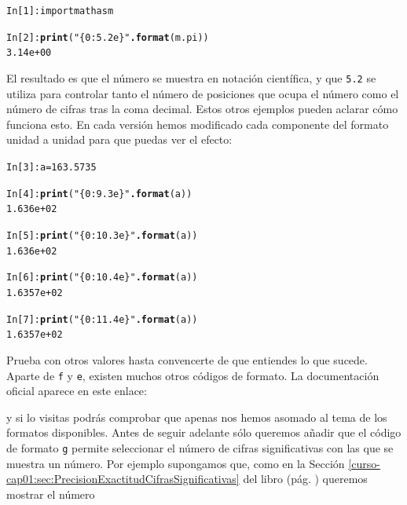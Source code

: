 \documentclass[10pt,a4paper]{article}\usepackage[]{graphicx}\usepackage[]{color}
\makeatletter
\newcommand{\hlstr}[1]{\textcolor[rgb]{0.192,0.494,0.8}{#1}}%
\newcommand{\hlkwd}[1]{\textcolor[rgb]{0.737,0.353,0.396}{\textbf{#1}}}%
\newenvironment{kframe}{%
 \def\at@end@of@kframe{}%
 \ifinner\ifhmode%
  \def\at@end@of@kframe{\end{minipage}}%
  \begin{minipage}{\columnwidth}%
 \fi\fi%
 \def\FrameCommand##1{\hskip\@totalleftmargin \hskip-\fboxsep
 \colorbox{shadecolor}{##1}\hskip-\fboxsep
     \hskip-\linewidth \hskip-\@totalleftmargin \hskip\columnwidth}%
 \MakeFramed {\advance\hsize-\width
   \@totalleftmargin\z@ \linewidth\hsize
   \@setminipage}}%
 {\par\unskip\endMakeFramed%
 \at@end@of@kframe}
\newenvironment{knitrout}{}{} %
\newcounter {cont01}
\makeatother
\begin{document}
\begin{knitrout}
\color{fgcolor}\begin{kframe}
\begin{alltt}
In [1]: import math as m

In [2]: \hlkwd{print}(\hlstr{"\{0:5.2e\}"}\hlkwd{.format}(m.pi))
3.14e+00
\end{alltt}
\end{kframe}
\end{knitrout}
El resultado es que el número se muestra en notación científica, y que {\tt 5.2} se utiliza para controlar tanto el número de posiciones que ocupa el número como el número de cifras tras la coma decimal. Estos otros ejemplos pueden aclarar cómo funciona esto. En cada versión hemos modificado cada componente del formato unidad a unidad para que puedas ver el efecto:
\begin{knitrout}
\color{fgcolor}\begin{kframe}
\begin{alltt}
In [3]: a = 163.5735

In [4]: \hlkwd{print}(\hlstr{"\{0:9.3e\}"}\hlkwd{.format}(a))
1.636e+02

In [5]: \hlkwd{print}(\hlstr{"\{0:10.3e\}"}\hlkwd{.format}(a))
 1.636e+02

In [6]: \hlkwd{print}(\hlstr{"\{0:10.4e\}"}\hlkwd{.format}(a))
1.6357e+02

In [7]: \hlkwd{print}(\hlstr{"\{0:11.4e\}"}\hlkwd{.format}(a))
 1.6357e+02
\end{alltt}
\end{kframe}
\end{knitrout}
Prueba con otros valores hasta convencerte de que entiendes lo que sucede. Aparte de {\tt f} y {\tt e}, existen muchos otros códigos de formato. La documentación oficial aparece en este enlace:
\begin{center}
\end{center}
y si lo visitas podrás comprobar que apenas nos hemos asomado al tema de los formatos disponibles. Antes de seguir adelante sólo queremos añadir que el código de formato {\tt g} permite seleccionar el número de cifras significativas con las que se muestra un número.
Por ejemplo supongamos que, como en la Sección \ref{curso-cap01:sec:PrecisionExactitudCifrasSignificativas} del libro (pág. \pageref{curso-cap01:sec:PrecisionExactitudCifrasSignificativas}) queremos mostrar el número
\end{document}
